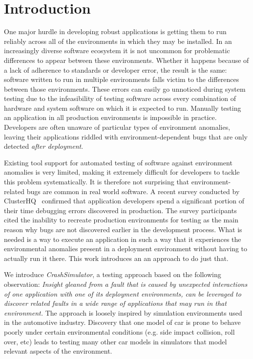\section{Introduction}

One major hurdle in developing robust applications is getting them to run reliably across all of the environments in
which they may be installed.  In an increasingly diverse software ecosystem it is not uncommon for problematic
differences to appear between these environments.  Whether it happens because of a lack of adherence to standards or
developer error, the result is the same: software written to run in multiple environments falls victim to the
differences between those environments.  These errors can easily go unnoticed 
during system testing due to the infeasibility of testing software
across every combination of hardware and system software on which it is expected to run.  Manually testing an application in
all production environments is impossible in practice. Developers are often unaware of particular types of environment
anomalies, leaving their applications riddled with environment-dependent bugs that are only detected \emph{after
  deployment}.

Existing tool support for automated testing of software against environment anomalies is very limited, making it
extremely difficult for developers to tackle this problem systematically.  It is therefore not surprising that
environment-related bugs are common in real world software. A recent survey conducted by
ClusterHQ~\cite{ClusterHQSurvey} confirmed that application developers spend a significant portion of their time debugging
errors discovered in production.  The survey participants cited the inability to recreate production environments for
testing as the main reason why bugs are not discovered earlier in the development process.  What is needed is a way to
execute an application in such a way that it experiences the environmental anomalies present in a deployment environment
without having to actually run it there.  This work introduces an an approach to do just that.

We introduce {\em CrashSimulator}, a testing approach based on the following observation:
{\em Insight gleaned from a fault that is caused by unexpected interactions 
of {\em one application} with one of its deployment environments, can be leveraged 
to discover related faults in a {\em wide range} of applications that may run in that environment.}
The approach is loosely inspired by simulation environments used in the automotive industry. Discovery
that one model of car is prone to behave poorly under certain environmental conditions (e.g. side impact collision,
roll over, etc) leads to testing many other car models in simulators that model relevant aspects of the environment.

